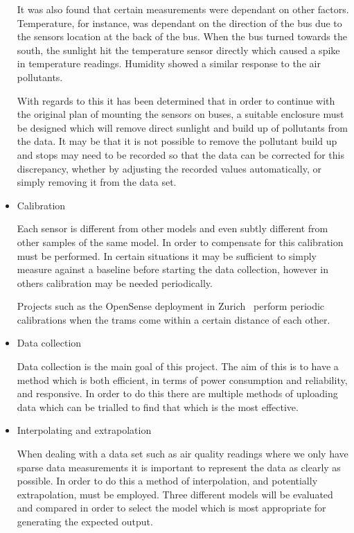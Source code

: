\begin{itemize}
	It was also found that certain measurements were dependant on other factors. Temperature, for instance, was dependant on the direction of the bus due to the sensors location at the back of the bus. When the bus turned towards the south, the sunlight hit the temperature sensor directly which caused a spike in temperature readings. Humidity showed a similar response to the air pollutants. 

	With regards to this it has been determined that in order to continue with the original plan of mounting the sensors on buses, a suitable enclosure must be designed which will remove direct sunlight and build up of pollutants from the data. It may be that it is not possible to remove the pollutant build up and stops may need to be recorded so that the data can be corrected for this discrepancy, whether by adjusting the recorded values automatically, or simply removing it from the data set. 

	\item Calibration

	Each sensor is different from other models and even subtly different from other samples of the same model. In order to compensate for this calibration must be performed. In certain situations it may be sufficient to simply measure against a baseline before starting the data collection, however in others calibration may be needed periodically. 

	Projects such as the OpenSense deployment in Zurich~\cite{opensensezurich} perform periodic calibrations when the trams come within a certain distance of each other. 



	\item Data collection
	
	Data collection is the main goal of this project. The aim of this is to have a method which is both efficient, in terms of power consumption and reliability, and responsive. In order to do this there are multiple methods of uploading data which can be trialled to find that which is the most effective.

	\item Interpolating and extrapolation

	When dealing with a data set such as air quality readings where we only have sparse data measurements it is important to represent the data as clearly as possible. In order to do this a method of interpolation, and potentially extrapolation, must be employed. Three  different models will be evaluated and compared in order to select the model which is most appropriate for generating the expected output.

\end{itemize}

